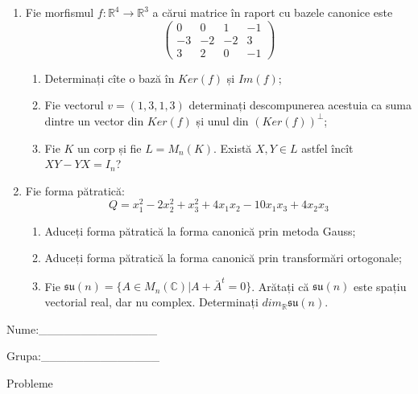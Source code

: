 \documentclass{article}
\begin{document}
\begin{enumerate}
 \item Fie morfismul $f:\mathbb{R}^4 \to \mathbb{R}^3$ a cărui matrice în raport cu bazele canonice este
$$\begin{pmatrix}
0&0&1&-1\\
-3&-2&-2&3\\
3&2&0&-1
\end{pmatrix}$$

\begin{enumerate}
\item Determinați cîte o bază în $Ker(f)$ și $Im(f)$;
\item Fie vectorul $v=(1,3,1,3)$ determinați descompunerea acestuia ca suma dintre un vector din $Ker(f)$ și unul din $(Ker(f))^\perp$;
\item Fie $K$ un corp și fie $L=M_n(K)$. Există $X,Y \in L$ astfel încît $XY-YX=I_n$?  
\end{enumerate}
\item Fie forma pătratică:
$$Q= x_1^2-2x_2^2+x_3^2+4x_1x_2-10x_1x_3+4x_2x_3$$

\begin{enumerate}
\item Aduceți forma pătratică la forma canonică prin metoda Gauss;
\item Aduceți forma pătratică la forma canonică prin transformări ortogonale;
\item Fie $\mathfrak{su}(n)=\{ A \in M_n(\mathbb{C}) | A+\bar{A}^t=0\}$. Arătați că $\mathfrak{su}(n)$ este spațiu vectorial real, dar nu complex.
Determinați $dim_{\mathbb{R}}\mathfrak{su}(n)$.
\end{enumerate}
\end{enumerate}
\newpage
\begin{flushright}
Nume:\_\_\_\_\_\_\_\_\_\_\_\_\_\_
 
 
Grupa:\_\_\_\_\_\_\_\_\_\_\_\_\_\_
\end{flushright}
\begin{center}
\vspace{2cm}
{\Large Probleme}
\vspace{2cm}
\end{center}
\end{document}
